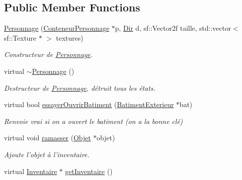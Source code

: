 \subsection*{Public Member Functions}
\begin{DoxyCompactItemize}
\item 
\hyperlink{classPersonnage_a07c0b4b58965fe9c519978e2ddbb8e7f}{Personnage} (\hyperlink{classConteneurPersonnage}{Conteneur\-Personnage} $\ast$p, \hyperlink{Espace_8h_a7cf6e8c5a5bc5e7b2afef3647870b1c4}{Dir} d, sf\-::\-Vector2f taille, std\-::vector$<$ sf\-::\-Texture $\ast$ $>$ textures)
\begin{DoxyCompactList}\small\item\em Constructeur de \hyperlink{classPersonnage}{Personnage}. \end{DoxyCompactList}\item 
\hypertarget{classPersonnage_a05bdf2a469885bb1fbb6c2e8f98972ab}{virtual \hyperlink{classPersonnage_a05bdf2a469885bb1fbb6c2e8f98972ab}{$\sim$\-Personnage} ()}\label{classPersonnage_a05bdf2a469885bb1fbb6c2e8f98972ab}

\begin{DoxyCompactList}\small\item\em Destructeur de \hyperlink{classPersonnage}{Personnage}, détruit tous les états. \end{DoxyCompactList}\item 
virtual bool \hyperlink{classPersonnage_ac2f4809fdfe2354f9e249dccd00fe4bc}{essayer\-Ouvrir\-Batiment} (\hyperlink{classBatimentExterieur}{Batiment\-Exterieur} $\ast$bat)
\begin{DoxyCompactList}\small\item\em Renvoie vrai si on a ouvert le batiment (on a la bonne clé) \end{DoxyCompactList}\item 
\hypertarget{classPersonnage_a8ae64b31f29ee6a1239a628a7e1d9620}{virtual void \hyperlink{classPersonnage_a8ae64b31f29ee6a1239a628a7e1d9620}{ramasser} (\hyperlink{classObjet}{Objet} $\ast$objet)}\label{classPersonnage_a8ae64b31f29ee6a1239a628a7e1d9620}

\begin{DoxyCompactList}\small\item\em Ajoute l'objet à l'inventaire. \end{DoxyCompactList}\item 
\hypertarget{classPersonnage_a1ec8306749f543f4396d511bb8b80621}{virtual \hyperlink{classInventaire}{Inventaire} $\ast$ \hyperlink{classPersonnage_a1ec8306749f543f4396d511bb8b80621}{get\-Inventaire} ()}\label{classPersonnage_a1ec8306749f543f4396d511bb8b80621}


\end{DoxyCompactItemize}
